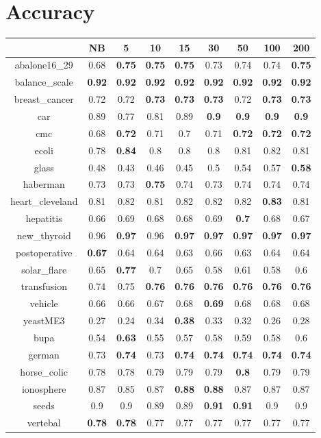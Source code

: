 \documentclass{article}%
\begin{document}
%
\normalsize%
\section*{Accuracy}%
\begin{tabular}{c|cccccccc}%
\hline%
&NB&5&10&15&30&50&100&200\\%
\hline%
abalone16\_29&0.68&\textbf{0.75}&\textbf{0.75}&\textbf{0.75}&0.73&0.74&0.74&\textbf{0.75}\\%
\hline%
balance\_scale&\textbf{0.92}&\textbf{0.92}&\textbf{0.92}&\textbf{0.92}&\textbf{0.92}&\textbf{0.92}&\textbf{0.92}&\textbf{0.92}\\%
\hline%
breast\_cancer&0.72&0.72&\textbf{0.73}&\textbf{0.73}&\textbf{0.73}&0.72&\textbf{0.73}&\textbf{0.73}\\%
\hline%
car&0.89&0.77&0.81&0.89&\textbf{0.9}&\textbf{0.9}&\textbf{0.9}&\textbf{0.9}\\%
\hline%
cmc&0.68&\textbf{0.72}&0.71&0.7&0.71&\textbf{0.72}&\textbf{0.72}&\textbf{0.72}\\%
\hline%
ecoli&0.78&\textbf{0.84}&0.8&0.8&0.8&0.81&0.82&0.81\\%
\hline%
glass&0.48&0.43&0.46&0.45&0.5&0.54&0.57&\textbf{0.58}\\%
\hline%
haberman&0.73&0.73&\textbf{0.75}&0.74&0.73&0.74&0.74&0.74\\%
\hline%
heart\_cleveland&0.81&0.82&0.81&0.82&0.82&0.82&\textbf{0.83}&0.81\\%
\hline%
hepatitis&0.66&0.69&0.68&0.68&0.69&\textbf{0.7}&0.68&0.67\\%
\hline%
new\_thyroid&0.96&\textbf{0.97}&0.96&\textbf{0.97}&\textbf{0.97}&\textbf{0.97}&\textbf{0.97}&\textbf{0.97}\\%
\hline%
postoperative&\textbf{0.67}&0.64&0.64&0.63&0.66&0.63&0.64&0.64\\%
\hline%
solar\_flare&0.65&\textbf{0.77}&0.7&0.65&0.58&0.61&0.58&0.6\\%
\hline%
transfusion&0.74&0.75&\textbf{0.76}&\textbf{0.76}&\textbf{0.76}&\textbf{0.76}&\textbf{0.76}&\textbf{0.76}\\%
\hline%
vehicle&0.66&0.66&0.67&0.68&\textbf{0.69}&0.68&0.68&0.68\\%
\hline%
yeastME3&0.27&0.24&0.34&\textbf{0.38}&0.33&0.32&0.26&0.28\\%
\hline%
bupa&0.54&\textbf{0.63}&0.55&0.57&0.58&0.59&0.58&0.6\\%
\hline%
german&0.73&\textbf{0.74}&0.73&\textbf{0.74}&\textbf{0.74}&\textbf{0.74}&\textbf{0.74}&\textbf{0.74}\\%
\hline%
horse\_colic&0.78&0.78&0.79&0.79&0.79&\textbf{0.8}&0.79&0.79\\%
\hline%
ionosphere&0.87&0.85&0.87&\textbf{0.88}&\textbf{0.88}&0.87&0.87&0.87\\%
\hline%
seeds&0.9&0.9&0.89&0.89&\textbf{0.91}&\textbf{0.91}&0.9&0.9\\%
\hline%
vertebal&\textbf{0.78}&\textbf{0.78}&0.77&0.77&0.77&0.77&0.77&0.77\\%
\hline%
\end{tabular}
\end{document}
